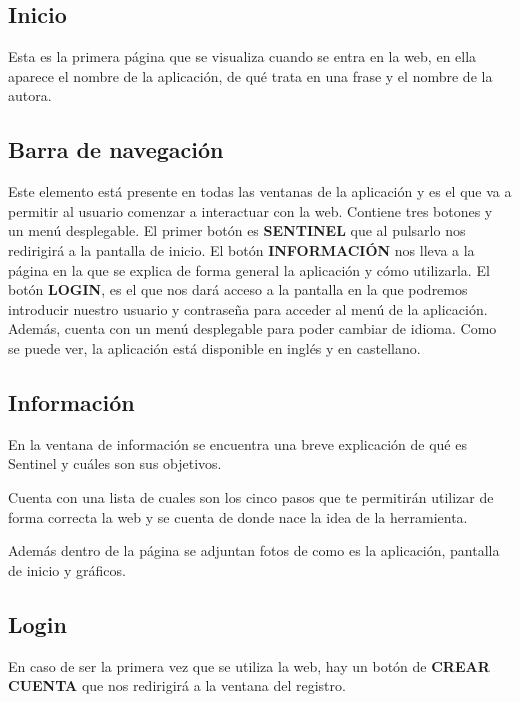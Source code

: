 \subsection{Inicio}
Esta es la primera página que se visualiza cuando se entra en la web, en ella aparece el nombre de la aplicación, de qué trata en una frase y el nombre de la autora.


\subsection{Barra de navegación}
Este elemento está presente en todas las ventanas de la aplicación y es el que va a permitir al usuario comenzar a interactuar con la web.
Contiene tres botones y un menú desplegable. 
El primer botón es \textbf{SENTINEL} que al pulsarlo nos redirigirá a la pantalla de inicio.
El botón \textbf{INFORMACIÓN} nos lleva a la página en la que se explica de forma general la aplicación y cómo utilizarla.
El botón \textbf{LOGIN}, es el que nos dará acceso a la pantalla en la que podremos introducir nuestro usuario y contraseña para acceder al menú de la aplicación.
Además, cuenta con un menú desplegable para poder cambiar de idioma. Como se puede ver, la aplicación está disponible en inglés y en castellano.
 

\subsection{Información}
En la ventana de información se encuentra una breve explicación de qué es Sentinel y cuáles son sus objetivos.

Cuenta con una lista de cuales son los cinco pasos que te permitirán utilizar de forma correcta la web y se cuenta de donde nace la idea de la herramienta.

Además dentro de la página se adjuntan fotos de como es la aplicación, pantalla de inicio y gráficos.


\subsection{Login}
En caso de ser la primera vez que se utiliza la web, hay un botón de \textbf{CREAR CUENTA} que nos redirigirá a la ventana del registro.

